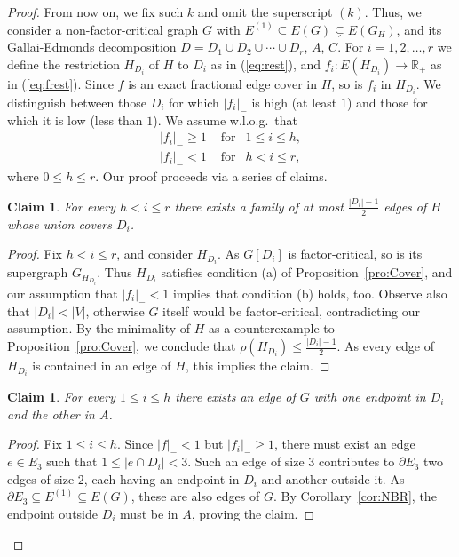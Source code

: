\documentclass{article}
\newtheorem{claim}[theorem]{Claim}
\theoremstyle{definition}
\begin{document}
\begin{proof}
From now on, we fix such $k$ and omit the superscript $(k)$. Thus, we consider a non-factor-critical graph $G$ with $E^{(1)} \subseteq E(G) \subsetneq E(G_H)$, and its Gallai-Edmonds decomposition $D = D_1 \cup D_2 \cup \cdots \cup D_r$, $A$, $C$. For $i=1,2, \ldots , r$ we define the restriction $H_{D_i}$ of $H$ to $D_i$ as in (\ref{eq:rest}), and $f_i: E(H_{D_i}) \to \mathbb{R}_+$ as in (\ref{eq:frest}). Since $f$ is an exact fractional edge cover in $H$, so is $f_i$ in $H_{D_i}$. We distinguish between those $D_i$ for which $|f_i|_-$ is high (at least $1$) and those for which it is low (less than $1$). We assume w.l.o.g.\ that
\begin{eqnarray*}
|f_i|_-  \ge 1\,\, & \textrm{for} & 1 \le i \le h, \\
|f_i|_-  < 1\,\, & \textrm{for} & h < i \le r,
\end{eqnarray*}
where $0 \le h \le r$.
Our proof proceeds via a series of claims.
\begin{claim} \label{cl:Low}
For every $h < i \le r$ there exists a family of at most $\frac{|D_i|-1}{2}$ edges of $H$ whose union covers $D_i$.
\end{claim}
\begin{proof} Fix $h < i \le r$, and consider $H_{D_i}$. As $G[D_i]$ is factor-critical, so is its supergraph $G_{H_{D_i}}$. Thus $H_{D_i}$ satisfies condition (a) of Proposition~\ref{pro:Cover}, and our assumption that $|f_i|_- < 1$ implies that condition (b) holds, too. Observe also that $|D_i| < |V|$, otherwise $G$ itself would be factor-critical, contradicting our assumption. By the minimality of $H$ as a counterexample to Proposition~\ref{pro:Cover}, we conclude that $\rho(H_{D_i}) \le \frac{|D_i|-1}{2}$. As every edge of $H_{D_i}$ is contained in an edge of $H$, this implies the claim.
\end{proof}
\begin{claim} \label{cl:Edge}
For every $1 \le i \le h$ there exists an edge of $G$ with one endpoint in $D_i$ and the other in $A$.
\end{claim}
\begin{proof} Fix $1 \le i \le h$. Since $|f|_- < 1$ but $|f_i|_- \ge 1$, there must exist an edge $e \in E_3$ such that $1 \le |e \cap D_i| < 3$. Such an edge of size $3$ contributes to $\partial E_3$ two edges of size $2$, each having an endpoint in $D_i$ and another outside it. As $\partial E_3 \subseteq E^{(1)} \subseteq E(G)$, these are also edges of $G$. By Corollary~\ref{cor:NBR}, the endpoint outside $D_i$ must be in $A$, proving the claim.

\end{proof}
\end{proof}
\end{document}
